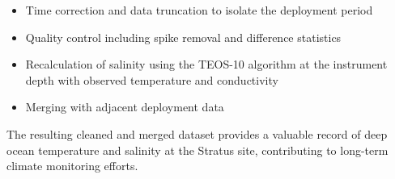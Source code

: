 \documentclass[11pt]{article}
\newcommand{\displayprojectname}{Stratus}
\begin{document}
\begin{itemize}
    \item Time correction and data truncation to isolate the deployment period
    \item Quality control including spike removal and difference statistics
    \item Recalculation of salinity using the TEOS-10 algorithm at the instrument depth with observed temperature and conductivity
    \item Merging with adjacent deployment data %
\end{itemize}

The resulting cleaned and merged dataset provides a valuable record of deep ocean temperature and salinity 
at the \displayprojectname{} site, contributing to long-term climate monitoring efforts.
\end{document}
